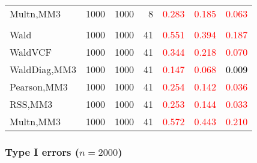 \documentclass[
]{article}
\begin{document}
\begin{table}[H]
{\begin{tabular}[t]{lrrrrrr}
\hspace{1em}Multn,MM3 & 1000 & 1000 & 8 & \textcolor{red}{0.283} & \textcolor{red}{0.185} & \textcolor{red}{0.063}\\
\addlinespace[0.3em]
\multicolumn{7}{l}{\textbf{3F 15V}}\\
\hspace{1em}Wald & 1000 & 1000 & 41 & \textcolor{red}{0.551} & \textcolor{red}{0.394} & \textcolor{red}{0.187}\\
\hspace{1em}WaldVCF & 1000 & 1000 & 41 & \textcolor{red}{0.344} & \textcolor{red}{0.218} & \textcolor{red}{0.070}\\
\hspace{1em}WaldDiag,MM3 & 1000 & 1000 & 41 & \textcolor{red}{0.147} & \textcolor{red}{0.068} & \textcolor{black}{0.009}\\
\hspace{1em}Pearson,MM3 & 1000 & 1000 & 41 & \textcolor{red}{0.254} & \textcolor{red}{0.142} & \textcolor{red}{0.036}\\
\hspace{1em}RSS,MM3 & 1000 & 1000 & 41 & \textcolor{red}{0.253} & \textcolor{red}{0.144} & \textcolor{red}{0.033}\\
\hspace{1em}Multn,MM3 & 1000 & 1000 & 41 & \textcolor{red}{0.572} & \textcolor{red}{0.443} & \textcolor{red}{0.210}\\
\bottomrule
\end{tabular}}
\endgroup{}
\end{table}

\hypertarget{type-i-errors-n2000-1}{%
\subsubsection{\texorpdfstring{Type I errors
(\(n=2000\))}{Type I errors (n=2000)}}\label{type-i-errors-n2000-1}}
\end{document}
